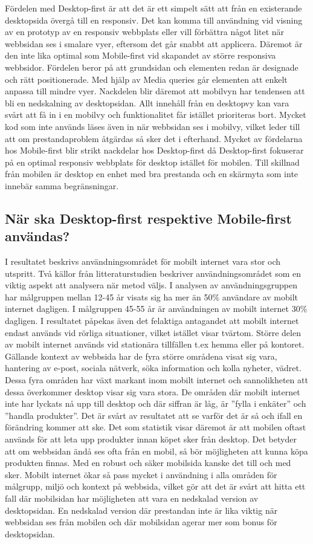 \documentclass[11pt]{article}
\begin{document}
Fördelen med Desktop-first är att det är ett simpelt sätt att från en existerande desktopsida övergå till en responsiv. Det kan komma till användning vid visning av en prototyp av en responsiv webbplats eller vill förbättra något litet när webbsidan ses i smalare vyer, eftersom det går snabbt att applicera. Däremot är den inte lika optimal som Mobile-first vid skapandet av större responsiva webbsidor. Fördelen beror på att grundsidan och elementen redan är designade och rätt positionerade. Med hjälp av Media queries går elementen att enkelt anpassa till mindre vyer. Nackdelen blir däremot att mobilvyn har tendensen att bli en nedskalning av desktopsidan. Allt innehåll från en desktopvy kan vara svårt att få in i en mobilvy och funktionalitet får istället prioriteras bort. Mycket kod som inte används läses även in när webbsidan ses i mobilvy, vilket leder till att om prestandaproblem åtgärdas så sker det i efterhand. Mycket av fördelarna hos Mobile-first blir strikt nackdelar hos Desktop-first då Desktop-first fokuserar på en optimal responsiv webbplats för desktop istället för mobilen. Till skillnad från mobilen är desktop en enhet med bra prestanda och en skärmyta som inte innebär samma begränsningar.

\subsection{När ska Desktop-first respektive Mobile-first användas?}
I resultatet beskrivs användningsområdet för mobilt internet vara stor och utspritt. Två källor från litteraturstudien beskriver användningsområdet som en viktig aspekt att analysera när metod väljs. I analysen av användningsgruppen har målgruppen mellan 12-45 år visats sig ha mer än 50\% användare av mobilt internet dagligen. I målgruppen 45-55 år är användningen av mobilt internet 30\% dagligen. I resultatet påpekas även det felaktiga antagandet att mobilt internet endast används vid rörliga situationer, vilket istället visar tvärtom. Större delen av mobilt internet används vid stationära tillfällen t.ex hemma eller på kontoret. Gällande kontext av webbsida har de fyra större områdena visat sig vara, hantering av e-post, sociala nätverk, söka information och kolla nyheter, vädret.  Dessa fyra områden har växt markant inom mobilt internet och sannolikheten att dessa överkommer desktop visar sig vara stora. De områden där mobilt internet inte har lyckats nå upp till desktop och där siffran är låg, är ”fylla i enkäter” och ”handla produkter”. Det är svårt av resultatet att se varför det är så och ifall en förändring kommer att ske. Det som statistik visar däremot är att mobilen oftast används för att leta upp produkter innan köpet sker från desktop. Det betyder att om webbsidan ändå ses ofta från en mobil, så bör möjligheten att kunna köpa produkten finnas. Med en robust och säker mobilsida kanske det till och med sker. Mobilt internet ökar så pass mycket i användning i alla områden för målgrupp,  miljö och kontext på webbsida, vilket gör att det är svårt att hitta ett fall där mobilsidan har möjligheten att vara en nedskalad version av desktopsidan. En nedskalad version där prestandan inte är lika viktig när webbsidan ses från mobilen och där mobilsidan agerar mer som bonus för desktopsidan.
\end{document}
